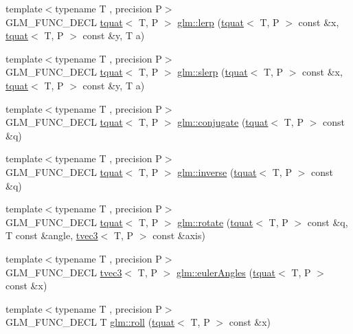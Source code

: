 \begin{DoxyCompactItemize}
\item 
{\footnotesize template$<$typename T , precision P$>$ }\\G\+L\+M\+\_\+\+F\+U\+N\+C\+\_\+\+D\+E\+CL \hyperlink{structglm_1_1tquat}{tquat}$<$ T, P $>$ \hyperlink{group__gtc__quaternion_ga5692804fa4db9e762a1c19b607e54435}{glm\+::lerp} (\hyperlink{structglm_1_1tquat}{tquat}$<$ T, P $>$ const \&x, \hyperlink{structglm_1_1tquat}{tquat}$<$ T, P $>$ const \&y, T a)
\item 
{\footnotesize template$<$typename T , precision P$>$ }\\G\+L\+M\+\_\+\+F\+U\+N\+C\+\_\+\+D\+E\+CL \hyperlink{structglm_1_1tquat}{tquat}$<$ T, P $>$ \hyperlink{group__gtc__quaternion_ga22b438c7252f3fa5b773c9882471652a}{glm\+::slerp} (\hyperlink{structglm_1_1tquat}{tquat}$<$ T, P $>$ const \&x, \hyperlink{structglm_1_1tquat}{tquat}$<$ T, P $>$ const \&y, T a)
\item 
{\footnotesize template$<$typename T , precision P$>$ }\\G\+L\+M\+\_\+\+F\+U\+N\+C\+\_\+\+D\+E\+CL \hyperlink{structglm_1_1tquat}{tquat}$<$ T, P $>$ \hyperlink{group__gtc__quaternion_gab1ace864fbf189ffa368950001808a3c}{glm\+::conjugate} (\hyperlink{structglm_1_1tquat}{tquat}$<$ T, P $>$ const \&q)
\item 
{\footnotesize template$<$typename T , precision P$>$ }\\G\+L\+M\+\_\+\+F\+U\+N\+C\+\_\+\+D\+E\+CL \hyperlink{structglm_1_1tquat}{tquat}$<$ T, P $>$ \hyperlink{group__gtc__quaternion_ga5f47300c024c2d809944e6ac661d6d14}{glm\+::inverse} (\hyperlink{structglm_1_1tquat}{tquat}$<$ T, P $>$ const \&q)
\item 
{\footnotesize template$<$typename T , precision P$>$ }\\G\+L\+M\+\_\+\+F\+U\+N\+C\+\_\+\+D\+E\+CL \hyperlink{structglm_1_1tquat}{tquat}$<$ T, P $>$ \hyperlink{group__gtc__quaternion_gaa8f42979c921e450ff2812fb43c25702}{glm\+::rotate} (\hyperlink{structglm_1_1tquat}{tquat}$<$ T, P $>$ const \&q, T const \&angle, \hyperlink{structglm_1_1tvec3}{tvec3}$<$ T, P $>$ const \&axis)
\item 
{\footnotesize template$<$typename T , precision P$>$ }\\G\+L\+M\+\_\+\+F\+U\+N\+C\+\_\+\+D\+E\+CL \hyperlink{structglm_1_1tvec3}{tvec3}$<$ T, P $>$ \hyperlink{group__gtc__quaternion_gadb92ec1c1b0dd6b024176a73fbef3e64}{glm\+::euler\+Angles} (\hyperlink{structglm_1_1tquat}{tquat}$<$ T, P $>$ const \&x)
\item 
{\footnotesize template$<$typename T , precision P$>$ }\\G\+L\+M\+\_\+\+F\+U\+N\+C\+\_\+\+D\+E\+CL T \hyperlink{group__gtc__quaternion_ga4fd705376c6c1fd667be0055a0ea58ec}{glm\+::roll} (\hyperlink{structglm_1_1tquat}{tquat}$<$ T, P $>$ const \&x)

\end{DoxyCompactItemize}
